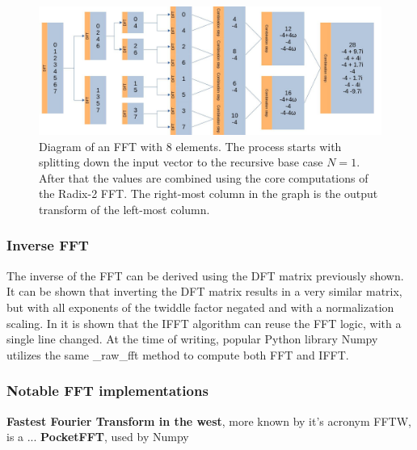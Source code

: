 \begin{figure}[ht]
    \centering
    \includegraphics[width=\textwidth]{./images/fft.jpg}
    \caption{Diagram of an FFT with 8 elements. The process starts with splitting down the input vector to the recursive base case $N=1$. After that the values are combined using the core computations of the Radix-2 FFT. The right-most column in the graph is the output transform of the left-most column.\label{fig:FFT-Alg}}
\end{figure}


\subsubsection{Inverse FFT}
The inverse of the FFT can be derived using the DFT matrix previously shown. It can be shown that inverting the DFT matrix results in a very similar matrix, but with all exponents of the twiddle factor negated and with a normalization scaling. In \cite{Reducible2020} it is shown that the IFFT algorithm can reuse the FFT logic, with a single line changed. At the time of writing, popular Python library Numpy utilizes the same \_raw\_fft method to compute both FFT and IFFT.  

\subsubsection{Notable FFT implementations}
\textbf{Fastest Fourier Transform in the west}, more known by it's acronym FFTW, is a ...
\textbf{PocketFFT}, used by Numpy







